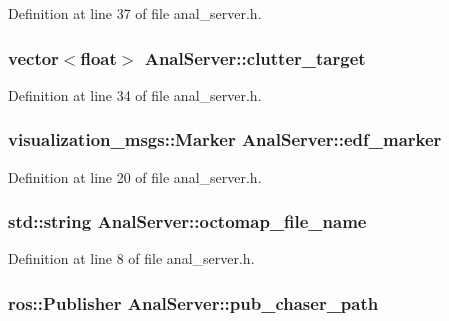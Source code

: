 Definition at line 37 of file anal\+\_\+server.\+h.

\subsubsection[{\texorpdfstring{clutter\+\_\+target}{clutter_target}}]{\setlength{\rightskip}{0pt plus 5cm}vector$<$float$>$ Anal\+Server\+::clutter\+\_\+target}\hypertarget{class_anal_server_a933f748012a639bc8f07edbfaa42d268}{}\label{class_anal_server_a933f748012a639bc8f07edbfaa42d268}


Definition at line 34 of file anal\+\_\+server.\+h.

\subsubsection[{\texorpdfstring{edf\+\_\+marker}{edf_marker}}]{\setlength{\rightskip}{0pt plus 5cm}visualization\+\_\+msgs\+::\+Marker Anal\+Server\+::edf\+\_\+marker}\hypertarget{class_anal_server_a7c910a2fc912d3b317390f67d21312b1}{}\label{class_anal_server_a7c910a2fc912d3b317390f67d21312b1}


Definition at line 20 of file anal\+\_\+server.\+h.

\subsubsection[{\texorpdfstring{octomap\+\_\+file\+\_\+name}{octomap_file_name}}]{\setlength{\rightskip}{0pt plus 5cm}std\+::string Anal\+Server\+::octomap\+\_\+file\+\_\+name}\hypertarget{class_anal_server_a362fcfd026bb7bd84404b66d2adee477}{}\label{class_anal_server_a362fcfd026bb7bd84404b66d2adee477}


Definition at line 8 of file anal\+\_\+server.\+h.

\subsubsection[{\texorpdfstring{pub\+\_\+chaser\+\_\+path}{pub_chaser_path}}]{\setlength{\rightskip}{0pt plus 5cm}ros\+::\+Publisher Anal\+Server\+::pub\+\_\+chaser\+\_\+path}\hypertarget{class_anal_server_a7974a75afcd838b877386eed62750877}{}\label{class_anal_server_a7974a75afcd838b877386eed62750877}


